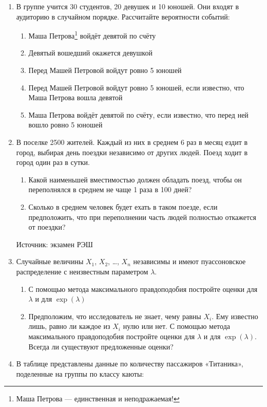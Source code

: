 \documentclass[12pt, a4paper]{article}\usepackage[]{graphicx}\usepackage[]{color}
\begin{document}
\begin{enumerate}
\item В группе учится 30 студентов, 20 девушек и 10 юношей. Они входят в аудиторию в случайном порядке. Рассчитайте вероятности событий:
\begin{enumerate}
\item Маша Петрова\footnote{Маша Петрова — единственная и неподражаемая!} войдёт девятой по счёту
\item Девятый вошедший окажется девушкой
\item Перед Машей Петровой войдут ровно 5 юношей
\item Перед Машей Петровой войдут ровно 5 юношей, если известно, что Маша Петрова вошла девятой
\item Маша Петрова войдёт девятой по счёту, если известно, что перед ней вошло ровно 5 юношей
\end{enumerate}

\item В поселке 2500 жителей. Каждый из них в среднем 6 раз в месяц ездит в город, выбирая день поездки независимо от других людей. Поезд ходит в город один раз в сутки.
\begin{enumerate}
\item Какой наименьшей вместимостью должен обладать поезд, чтобы он переполнялся в среднем не чаще 1 раза в 100 дней?
\item Сколько в среднем человек будет ехать в таком поезде, если предположить, что при переполнении часть людей полностью откажется от поездки?
\end{enumerate}

Источник: экзамен РЭШ

\item Случайные величины $X_1$, $X_2$, \ldots, $X_n$ независимы и имеют пуассоновское распределение с неизвестным параметром $\lambda$.
\begin{enumerate}
\item С помощью метода максимального правдоподобия постройте оценки для $\lambda$ и для $\exp(\lambda)$
\item Предположим, что исследователь не знает, чему равны $X_i$. Ему известно лишь, равно ли каждое из $X_i$ нулю или нет. С помощью метода максимального правдоподобия постройте оценки для $\lambda$ и для $\exp(\lambda)$. Всегда ли существуют предложенные оценки?
\end{enumerate}


\item В таблице представлены данные по количеству пассажиров «Титаника», поделенные на группы по классу каюты:


\end{enumerate}
\end{document}
